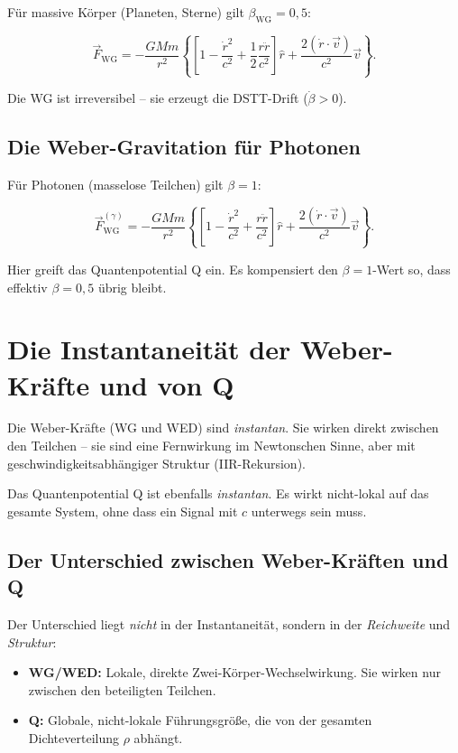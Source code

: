 Für massive Körper (Planeten, Sterne) gilt \( \beta_{\text{WG}} = 0,5 \):

\begin{equation}
\vec{F}_{\text{WG}} = -\frac{GMm}{r^2} \left\{ \left[ 1 - \frac{\dot{r}^2}{c^2} + \frac{1}{2}\frac{r\ddot{r}}{c^2} \right] \hat{r} + \frac{2(\dot{r} \cdot \vec{v})}{c^2} \vec{v} \right\}. \tag{5.3}
\end{equation}

Die WG ist irreversibel – sie erzeugt die DSTT-Drift (\( \dot{\beta} > 0 \)).

\subsection{Die Weber-Gravitation für Photonen}

Für Photonen (masselose Teilchen) gilt \( \beta = 1 \):

\begin{equation}
\vec{F}_{\text{WG}}^{(\gamma)} = -\frac{GMm}{r^2} \left\{ \left[ 1 - \frac{\dot{r}^2}{c^2} + \frac{r\ddot{r}}{c^2} \right] \hat{r} + \frac{2(\dot{r} \cdot \vec{v})}{c^2} \vec{v} \right\}. \tag{5.4}
\end{equation}

Hier greift das Quantenpotential Q ein. Es kompensiert den \( \beta = 1 \)-Wert so, dass effektiv \( \beta = 0,5 \) übrig bleibt.

\section{Die Instantaneität der Weber-Kräfte und von Q}

Die Weber-Kräfte (WG und WED) sind \emph{instantan}. Sie wirken direkt zwischen den Teilchen – sie sind eine Fernwirkung im Newtonschen Sinne, aber mit
geschwindigkeitsabhängiger Struktur (IIR-Rekursion). 

Das Quantenpotential Q ist ebenfalls \emph{instantan}. Es wirkt nicht-lokal auf das gesamte System, ohne dass ein Signal mit \(c\) unterwegs sein muss.

\subsection{Der Unterschied zwischen Weber-Kräften und Q}

Der Unterschied liegt \emph{nicht} in der Instantaneität, sondern in der \emph{Reichweite} und \emph{Struktur}:

\begin{itemize}
    \item \textbf{WG/WED:} Lokale, direkte Zwei-Körper-Wechselwirkung. Sie wirken nur zwischen den beteiligten Teilchen.
    \item \textbf{Q:} Globale, nicht-lokale Führungsgröße, die von der gesamten Dichteverteilung \( \rho \) abhängt.
\end{itemize}


